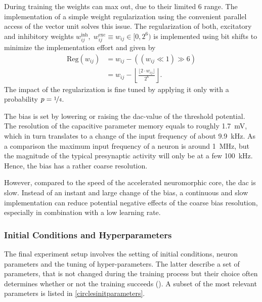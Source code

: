 During training the weights can max out, due to their limited \SI{6}{\bit} range. The implementation of a simple weight regularization using the convenient parallel access of the vector unit solves this issue. The regularization of both, excitatory and inhibitory weights $w_{ij}^\text{inh},\; w_{ij}^\text{exc}\equiv w_{ij} \in [0,2^6)$ is implemented using bit shifts to minimize the implementation effort and given by
\begin{align*}
\text{Reg}(w_{ij}) &= w_{ij} - \left(\left(w_{ij} \ll 1\right) \gg 6\right) \nonumber \\
&= w_{ij} - \left\lfloor \frac{\lfloor 2 \cdot w_{ij}  \rfloor}{2^{6}} \right\rfloor.					
\end{align*}
The impact of the regularization is fine tuned by applying it only with a probability $p=\nicefrac{1}{4}$.

The bias is set by lowering or raising the \gls{dac}-value of the threshold potential. The resolution of the capacitive parameter memory equals to roughly \SI{1.7}{\milli \V}, which in turn translates to a change of the input frequency of about \SI{9.9}{\kilo \Hz}. As a comparison the maximum input frequency of a neuron is around \SI{1}{\mega \Hz}, but the magnitude of the typical presynaptic activity will only be at a few \SI{100}{\kilo \Hz}. Hence, the bias has a rather coarse resolution.

However, compared to the speed of the accelerated neuromorphic core, the \acrlong{dac} is slow. Instead of an instant and large change of the bias, a continuous and slow implementation can reduce potential negative effects of the coarse bias resolution, especially in combination with a low learning rate.

\subsubsection*{Initial Conditions and Hyperparameters}

The final experiment setup involves the setting of initial conditions, neuron parameters and the tuning of hyper-parameters. The latter describe a set of parameters, that is not changed during the training process but their choice often determines whether or not the training succeeds (\citealp{Goodfellow-et-al-2016}). A subset of the most relevant parameters is listed in \cref{circlesinitparameters}.

